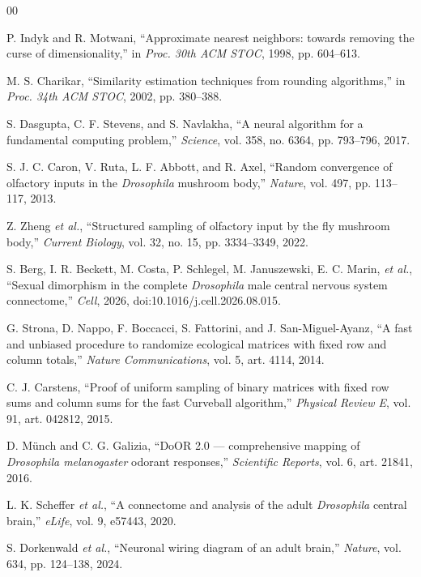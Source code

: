\documentclass[conference]{IEEEtran}
\begin{document}
\footnotesize
\begin{thebibliography}{00}
\setlength{\itemsep}{0pt}

 P. Indyk and R. Motwani, ``Approximate nearest neighbors:
towards removing the curse of dimensionality,'' in \emph{Proc. 30th ACM STOC},
1998, pp. 604--613.

 M. S. Charikar, ``Similarity estimation techniques from
rounding algorithms,'' in \emph{Proc. 34th ACM STOC}, 2002, pp. 380--388.

 S. Dasgupta, C. F. Stevens, and S. Navlakha, ``A neural
algorithm for a fundamental computing problem,'' \emph{Science}, vol. 358, no.
6364, pp. 793--796, 2017.

 S. J. C. Caron, V. Ruta, L. F. Abbott, and R. Axel,
``Random convergence of olfactory inputs in the \emph{Drosophila} mushroom
body,'' \emph{Nature}, vol. 497, pp. 113--117, 2013.

 Z. Zheng \textit{et al.}, ``Structured sampling of
olfactory input by the fly mushroom body,'' \emph{Current Biology}, vol. 32,
no. 15, pp. 3334--3349, 2022.

 S. Berg, I. R. Beckett, M. Costa, P. Schlegel, M.
Januszewski, E. C. Marin, \textit{et al.}, ``Sexual dimorphism in the complete
\emph{Drosophila} male central nervous system connectome,'' \emph{Cell}, 2026,
doi:10.1016/j.cell.2026.08.015.

 G. Strona, D. Nappo, F. Boccacci, S. Fattorini, and J.
San-Miguel-Ayanz, ``A fast and unbiased procedure to randomize ecological
matrices with fixed row and column totals,'' \emph{Nature Communications},
vol. 5, art. 4114, 2014.

 C. J. Carstens, ``Proof of uniform sampling of binary
matrices with fixed row sums and column sums for the fast Curveball
algorithm,'' \emph{Physical Review E}, vol. 91, art. 042812, 2015.

 D. M\"unch and C. G. Galizia, ``DoOR 2.0 --- comprehensive
mapping of \emph{Drosophila melanogaster} odorant responses,'' \emph{Scientific
Reports}, vol. 6, art. 21841, 2016.

 L. K. Scheffer \textit{et al.}, ``A connectome and
analysis of the adult \emph{Drosophila} central brain,'' \emph{eLife}, vol. 9,
e57443, 2020.

 S. Dorkenwald \textit{et al.}, ``Neuronal wiring
diagram of an adult brain,'' \emph{Nature}, vol. 634, pp. 124--138, 2024.


\end{thebibliography}
\end{document}
